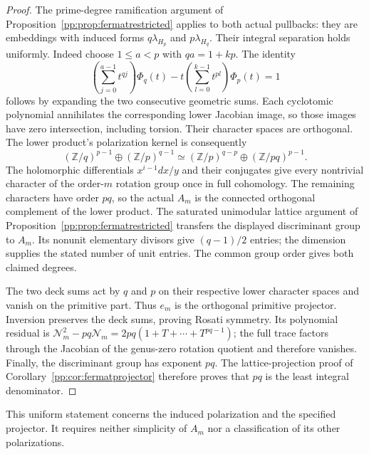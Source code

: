 \begin{proof}
The prime-degree ramification argument of
Proposition~\ref{pp:prop:fermatrestricted} applies to both actual
pullbacks: they are embeddings with induced forms $q\lambda_{H_p}$
and $p\lambda_{H_q}$. Their integral separation holds uniformly.
Indeed choose $1\leq a<p$ with $qa=1+kp$. The identity
\[
 \left(\sum_{j=0}^{a-1}t^{qj}\right)\Phi_q(t)
 -t\left(\sum_{l=0}^{k-1}t^{pl}\right)\Phi_p(t)=1
\]
follows by expanding the two consecutive geometric sums.
Each cyclotomic polynomial annihilates the corresponding lower
Jacobian image, so those images have zero intersection, including
torsion. Their character spaces are orthogonal. The lower product's
polarization kernel is consequently
\[
 (\mathbb Z/q)^{p-1}\oplus(\mathbb Z/p)^{q-1}
 \simeq(\mathbb Z/p)^{q-p}\oplus(\mathbb Z/pq)^{p-1}.
\]
The holomorphic differentials $x^{i-1}dx/y$ and their conjugates
give every nontrivial character of the order-$m$ rotation group once in full
cohomology. The remaining characters have order $pq$, so the actual
$A_m$ is the connected orthogonal complement of the lower product.
The saturated unimodular lattice argument of
Proposition~\ref{pp:prop:fermatrestricted} transfers the displayed
discriminant group to $A_m$. Its nonunit elementary divisors give
$(q-1)/2$ entries; the dimension supplies the stated number of unit
entries. The common group order gives both claimed degrees.

The two deck sums act by $q$ and $p$ on their respective lower
character spaces and vanish on the primitive part. Thus
$e_m$ is the orthogonal primitive projector. Inversion preserves
the deck sums, proving Rosati symmetry. Its polynomial residual is
$\mathcal N_m^2-pq\mathcal N_m=2pq(1+T+\cdots+T^{pq-1})$;
the full trace factors through the Jacobian of the genus-zero rotation
quotient and therefore vanishes. Finally, the discriminant group has exponent $pq$.
The lattice-projection proof of
Corollary~\ref{pp:cor:fermatprojector} therefore proves that $pq$
is the least integral denominator.
\end{proof}

This uniform statement concerns the induced polarization and the
specified projector. It requires neither simplicity of $A_m$ nor
a classification of its other polarizations.


